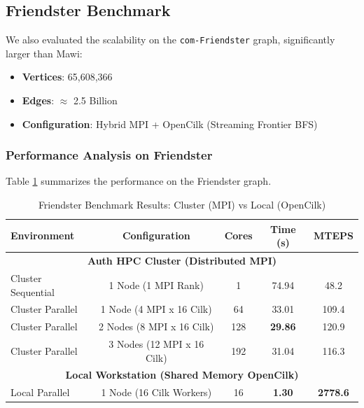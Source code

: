 \documentclass[11pt,a4paper]{article}
\begin{document}
\subsection{Friendster Benchmark}

We also evaluated the scalability on the \texttt{com-Friendster} graph, significantly larger than Mawi:
\begin{itemize}
    \item \textbf{Vertices}: 65,608,366
    \item \textbf{Edges}: $\approx$ 2.5 Billion
    \item \textbf{Configuration}: Hybrid MPI + OpenCilk (Streaming Frontier BFS)
\end{itemize}

\subsubsection{Performance Analysis on Friendster}

Table \ref{tab:friendster_results} summarizes the performance on the Friendster graph.

\begin{table}[H]
\centering
\begin{tabular}{lcccc}
\toprule
\textbf{Environment} & \textbf{Configuration} & \textbf{Cores} & \textbf{Time (s)} & \textbf{MTEPS} \\
\midrule
\multicolumn{5}{c}{\textbf{Auth HPC Cluster (Distributed MPI)}} \\
\midrule
Cluster Sequential & 1 Node (1 MPI Rank) & 1 & 74.94 & 48.2 \\
Cluster Parallel & 1 Node (4 MPI x 16 Cilk) & 64 & 33.01 & 109.4 \\
Cluster Parallel & 2 Nodes (8 MPI x 16 Cilk) & 128 & \textbf{29.86} & 120.9 \\
Cluster Parallel & 3 Nodes (12 MPI x 16 Cilk) & 192 & 31.04 & 116.3 \\
\midrule
\multicolumn{5}{c}{\textbf{Local Workstation (Shared Memory OpenCilk)}} \\
\midrule
Local Parallel & 1 Node (16 Cilk Workers) & 16 & \textbf{1.30} & \textbf{2778.6} \\
\bottomrule
\end{tabular}
\caption{Friendster Benchmark Results: Cluster (MPI) vs Local (OpenCilk)}
\label{tab:friendster_results}
\end{table}
\end{document}
